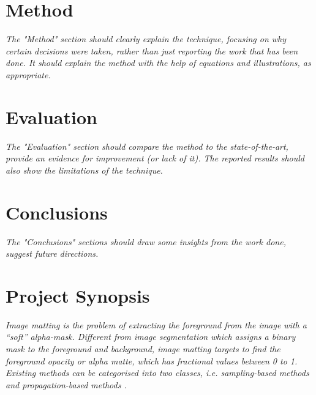 \documentclass{article}
\begin{document}
\begin{multicols}{2}[]


\section{Method}
\emph{The "Method" section should clearly explain the technique, focusing on why certain decisions were taken, rather than just reporting the work that has been done. It should explain the method with the help of equations and illustrations, as appropriate.}


\section{Evaluation}
\emph{The "Evaluation" section should compare the method to the state-of-the-art, provide an evidence for improvement (or lack of it). The reported results should also show the limitations of the technique.}




\section{Conclusions}
\emph{The "Conclusions" sections should draw some insights from the work done, suggest future directions.}

\end{multicols}
\newpage
\setcounter{section}{-1}
\section{Project Synopsis}
\emph{Image matting is the problem of extracting the foreground from the image with a ``soft'' alpha-mask. Different from image segmentation which assigns a binary mask to the foreground and background, image matting targets to find the foreground opacity or alpha matte, which has fractional values between 0 to 1. Existing methods can be categorised into two classes, i.e. sampling-based methods \cite{bayesian-matting, robust-matting} and propagation-based methods \cite{poisson-matting, closed-form-matting}.}
\end{document}
